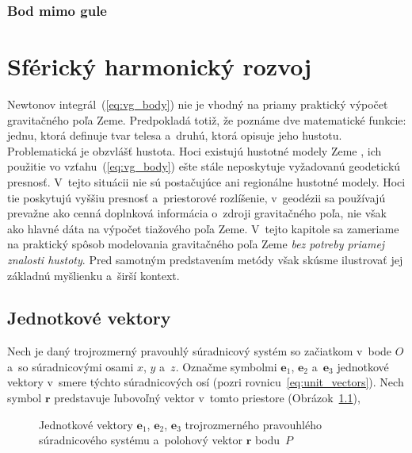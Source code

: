\documentclass[a4paper,12pt]{book}
\let\vec\mathbf
\begin{document}
\subsection{Bod mimo gule}
\label{sec:homogeneous_ball_ext}







\chapter{Sférický harmonický rozvoj}
\label{sec:spherical_harmonic_expansion}

Newtonov integrál~(\ref{eq:vg_body}) nie je vhodný na priamy praktický výpočet 
gravitačného poľa Zeme.  Predpokladá totiž, že poznáme dve matematické funkcie: 
jednu, ktorá definuje tvar telesa a~druhú, ktorá opisuje jeho hustotu.  
Problematická je obzvlášť hustota.  Hoci existujú hustotné modely Zeme 
\parencite[napríklad][]{Dziewonski1981}, ich použitie vo 
vzťahu~(\ref{eq:vg_body}) ešte stále neposkytuje vyžadovanú geodetickú 
presnosť.  V~tejto situácii nie sú postačujúce ani regionálne hustotné modely.  
Hoci tie poskytujú vyššiu presnosť a~priestorové rozlíšenie, v~geodézii sa 
používajú prevažne ako cenná doplnková informácia o~zdroji gravitačného poľa, 
nie však ako hlavné dáta na výpočet tiažového poľa Zeme.  V~tejto kapitole sa 
zameriame na praktický spôsob modelovania gravitačného poľa Zeme \emph{bez 
potreby priamej znalosti hustoty}.  Pred samotným predstavením metódy však 
skúsme ilustrovať jej základnú myšlienku a~širší kontext.






\section{Jednotkové vektory}
\label{sec:unit_vectors}

Nech je daný trojrozmerný pravouhlý súradnicový systém so začiatkom v~bode $O$
a~so súradnicovými osami $x$, $y$ a~$z$.  Označme symbolmi $\vec e_1$, $\vec
e_2$ a~$\vec e_3$ jednotkové vektory v~smere týchto súradnicových osí (pozri 
rovnicu~\ref{eq:unit_vectors}).  Nech symbol $\vec r$ predstavuje ľubovoľný 
vektor v~tomto priestore (Obrázok~\ref{fig:unit_vectors}),
\begin{figure}
\centering

\caption{Jednotkové vektory $\vec e_1$, $\vec e_2$, $\vec e_3$ trojrozmerného
pravouhlého súradnicového systému a~polohový vektor $\vec r$ bodu~$P$}
\label{fig:unit_vectors}
\end{figure}
\end{document}
